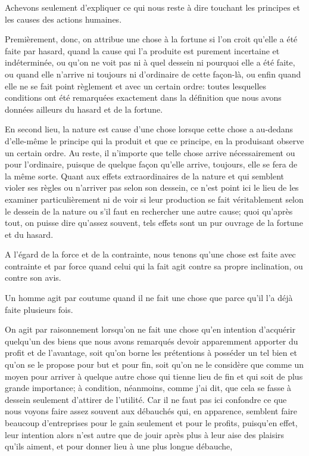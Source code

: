 Achevons seulement d'expliquer ce qui nous reste à dire touchant les principes et les causes des actions humaines.

\bigbreak

Premièrement, donc, on attribue une chose à la fortune si l'on croit qu'elle a été faite par hasard, quand la cause qui l'a
produite est purement incertaine et indéterminée, ou qu'on ne voit pas ni à quel dessein ni pourquoi elle a été faite, ou quand
elle n'arrive ni toujours ni d'ordinaire de cette façon-là, ou enfin quand elle ne se fait point règlement et avec un certain
ordre: toutes lesquelles conditions ont été remarquées exactement dans la définition que nous avons données ailleurs du hasard
et de la fortune. 

\bigbreak

En second lieu, la nature est cause d'une chose lorsque cette chose a au-dedans d'elle-même le principe qui la produit et
que ce principe, en la produisant observe un certain ordre. Au reste, il n'importe que telle chose arrive nécessairement ou
pour l'ordinaire, puisque de quelque façon qu'elle arrive, toujours, elle se fera de la même sorte. Quant aux effets
extraordinaires de la nature et qui semblent violer ses règles ou n'arriver pas selon son dessein, ce n'est point ici le
lieu de les examiner particulièrement ni de voir si leur production se fait véritablement selon le dessein de la nature ou
s'il faut en rechercher une autre cause; quoi qu'après tout, on puisse dire qu'assez souvent, tels effets sont un pur ouvrage
de la fortune et du hasard.

\bigbreak

A l'égard de la force et de la contrainte, nous tenons qu'une chose est faite avec contrainte et par force quand celui qui la
fait agit contre sa propre inclination, ou contre son avis.

\bigbreak

Un homme agit par coutume quand il ne fait une chose que parce qu'il l'a déjà faite plusieurs fois.

\bigbreak

On agit par raisonnement lorsqu'on ne fait une chose qu'en intention d'acquérir quelqu'un des biens que nous avons remarqués
devoir apparemment apporter du profit et de l'avantage, soit qu'on borne les prétentions à posséder un tel bien et qu'on se le
propose pour but et pour fin, soit qu'on ne le considère que comme un moyen pour arriver à quelque autre chose qui tienne lieu
de fin et qui soit de plus grande importance; à condition, néanmoins, comme j'ai dit, que cela se fasse à dessein seulement
d'attirer de l'utilité. Car il ne faut pas ici confondre ce que nous voyons faire assez souvent aux débauchés qui, en apparence,
semblent faire beaucoup d'entreprises pour le gain seulement et pour le profits, puisqu'en effet, leur intention alors n'est
autre que de jouir après plus à leur aise des plaisirs qu'ils aiment, et pour donner lieu à une plus longue débauche, 

